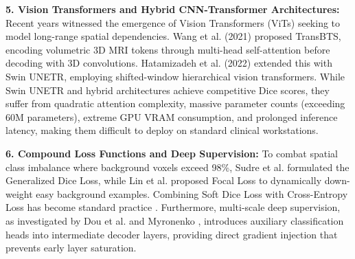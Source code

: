 \documentclass[conference]{IEEEtran}
\begin{document}
\textbf{5. Vision Transformers and Hybrid CNN-Transformer Architectures:} Recent years witnessed the emergence of Vision Transformers (ViTs) seeking to model long-range spatial dependencies. Wang et al. \cite{wang2021transbts} (2021) proposed TransBTS, encoding volumetric 3D MRI tokens through multi-head self-attention before decoding with 3D convolutions. Hatamizadeh et al. \cite{hatamizadeh2022swin} (2022) extended this with Swin UNETR, employing shifted-window hierarchical vision transformers. While Swin UNETR and hybrid architectures achieve competitive Dice scores, they suffer from quadratic attention complexity, massive parameter counts (exceeding 60M parameters), extreme GPU VRAM consumption, and prolonged inference latency, making them difficult to deploy on standard clinical workstations.

\textbf{6. Compound Loss Functions and Deep Supervision:} To combat spatial class imbalance where background voxels exceed 98\%, Sudre et al. \cite{sudre2017generalised} formulated the Generalized Dice Loss, while Lin et al. \cite{lin2017focal} proposed Focal Loss to dynamically down-weight easy background examples. Combining Soft Dice Loss with Cross-Entropy Loss has become standard practice \cite{isensee2021nnu}. Furthermore, multi-scale deep supervision, as investigated by Dou et al. \cite{dou20173d} and Myronenko \cite{myronenko20193d}, introduces auxiliary classification heads into intermediate decoder layers, providing direct gradient injection that prevents early layer saturation.
\end{document}
